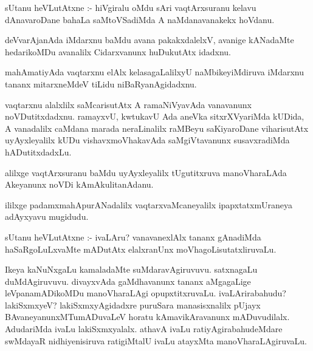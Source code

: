 \documentclass{article}
\begin{document}
\begin{mn}
sUtanu heVLutAtxne :- hiVgiralu  oMdu sAri vaqtArxsuranu kelavu dAnavaroDane 
bahaLa saMtoVSadiMda A naMdanavanakekx hoVdanu.
\end{mn}

\begin{mn}
deVvarAjanAda iMdarxnu baMdu avana pakakxdalelxV, avanige kANadaMte hedarikoMDu 
avanalilx Cidarxvanunx huDukutAtx idadxnu.
\end{mn}

\begin{mn}
mahAmatiyAda vaqtarxnu elAlx kelasagaLalilxyU  naMbikeyiMdiruva iMdarxnu 
tananx mitarxneMdeV tiLidu niBaRyanAgidadxnu.
\end{mn}

\begin{mn}
vaqtarxnu alalxlilx saMcarisutAtx A ramaNiVyavAda vanavanunx noVDutitxdadxnu.  
ramayxvU, kwtukavU Ada aneVka sitxrXVyariMda kUDida, A vanadalilx  caMdana 
marada neraLinalilx raMBeyu saKiyaroDane  viharisutAtx uyAyxleyalilx kUDu 
vishavxmoVhakavAda saMgiVtavanunx susavxradiMda hADutitxdadxLu.
\end{mn}

\begin{mn}
alilxge vaqtArxsuranu baMdu uyAyxleyalilx  tUgutitxruva manoVharaLAda Akeyanunx noVDi kAmAkulitanAdanu.
\end{mn}

\begin{mn}
ililxge padamxmahApurANadalilx vaqtarxvaMcaneyalilx  ipapxtatxmUraneya adAyxyavu mugidudu.
\end{mn}




\begin{mn}
sUtanu heVLutAtxne :- ivaLAru? vanavanexlAlx tananx gAnadiMda haSaRgoLuLxvaMte 
mADutAtx elalxranUnx moVhagoLisutatxliruvaLu. 
\end{mn}

\begin{mn}
Ikeya  kaNuNxgaLu kamaladaMte suMdaravAgiruvuvu.  satxnagaLu duMdAgiruvuvu.  
divayxvAda gaMdhavanunx tananx  aMgagaLige leVpanamADikoMDu manoVharaLAgi  
opupxtitxruvaLu. ivaLArirabahudu? lakiSxmxyeV?  lakiSxmxyAgidadxre puruSara 
manasisxnalilx pUjayx BAvaneyanunxMTumADuvaLeV horatu  kAmavikAravanunx 
mADuvudilalx. AdudariMda ivaLu  lakiSxmxyalalx. athavA ivaLu ratiyAgirabahudeMdare 
swMdayaR nidhiyenisiruva ratigiMtalU ivaLu atayxMta manoVharaLAgiruvaLu.
\end{mn}
\end{document}
